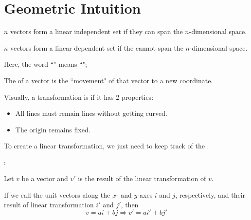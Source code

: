 \chapter{Geometric Intuition}

  \par $n$ vectors form a linear independent set if they can span the
    $n$-dimensional space.
  \par $n$ vectors form a linear dependent set if the cannot span the
    $n$-dimensional space.

    \par Here, the word ``" means ``";
    \par The  of a vector is the ``movement" of that
      vector to a new coordinate.
    \par Visually, a transformation is  if it has 2 properties:
    \begin{itemize}
      \item All lines must remain lines without getting curved.
      \item The origin remains fixed.
    \end{itemize}
    \par To create a linear transformation, we just need to keep track of
      the .
    \par {}:
    \par Let $v$ be a vector and $v'$ is the result of the linear
    transformation of $v$.
    \par If we call the unit vectors along the $x$- and $y$-axes $i$ and $j$,
    respectively, and their result of linear transformation $i'$ and $j'$,
    then
    \begin{equation}
      v = ai + bj \Rightarrow v' = ai' + bj'
    \end{equation}
